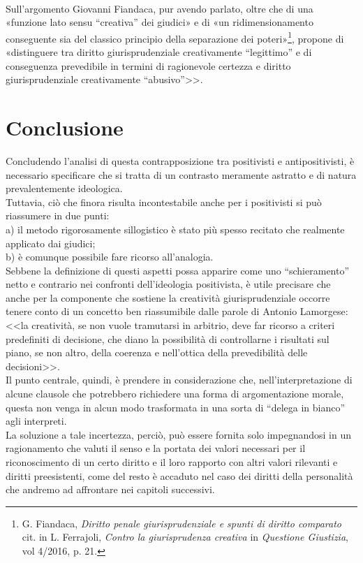 \\Sull'argomento Giovanni Fiandaca, pur avendo parlato, oltre che di una «funzione lato sensu “creativa” dei giudici» e di «un ridimensionamento conseguente sia del classico principio della separazione dei poteri»\footnote{G. Fiandaca, \textit{Diritto penale giurisprudenziale e spunti di diritto comparato} cit. in L. Ferrajoli, \textit{Contro la giurisprudenza creativa} in \textit{Questione Giustizia}, vol 4/2016, p. 21.}, propone di «distinguere tra diritto giurisprudenziale creativamente “legittimo” e di conseguenza prevedibile in termini di ragionevole certezza e diritto giurisprudenziale creativamente “abusivo”>>.


\section{Conclusione}
Concludendo l’analisi di questa contrapposizione tra positivisti e antipositivisti, è necessario specificare che si tratta di un contrasto meramente astratto e di natura prevalentemente ideologica. 
\\Tuttavia, ciò che finora risulta incontestabile anche per i positivisti si può riassumere in due punti:
\\a) il metodo rigorosamente sillogistico è stato più spesso recitato che realmente applicato dai giudici; 
\\b) è comunque possibile fare ricorso all'analogia.
\\Sebbene la definizione di questi aspetti possa apparire come uno “schieramento” netto e contrario nei confronti dell’ideologia positivista, è utile precisare che anche per la componente che sostiene la creatività giurisprudenziale occorre tenere conto di un concetto ben riassumibile dalle parole di Antonio Lamorgese: <<la creatività, se non vuole tramutarsi in arbitrio, deve far ricorso a criteri predefiniti di decisione, che diano la possibilità di controllarne i risultati sul piano, se non altro, della coerenza e nell'ottica della prevedibilità delle decisioni>>. 
\\Il punto centrale, quindi, è prendere in considerazione che, nell’interpretazione di alcune clausole che potrebbero richiedere una forma di argomentazione morale, questa non venga in alcun modo trasformata in una sorta di “delega in bianco” agli interpreti.
\\La soluzione a tale incertezza, perciò, può essere fornita solo impegnandosi in un ragionamento che valuti il senso e la portata dei valori necessari per il riconoscimento di un certo diritto e il loro rapporto con altri valori rilevanti e diritti preesistenti, come del resto è accaduto nel caso dei diritti della personalità che andremo ad affrontare nei capitoli successivi.